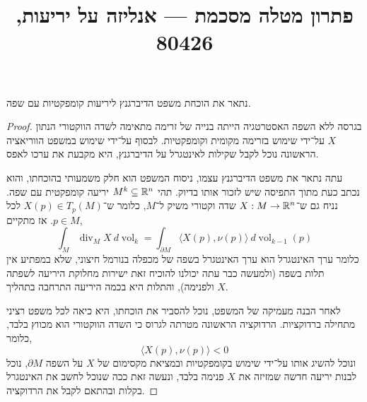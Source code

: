 
\title{פתרון מטלה מסכמת --- אנליזה על יריעות, 80426}

\DeclareMathOperator{\vol}{vol}
\DeclareMathOperator{\Div}{div}
\DeclareMathOperator{\curl}{curl}


\maketitle
\maketitleprint[blue]

\question{}
נתאר את הוכחת משפט הדיברגנץ ליריעות קומפקטיות עם שפה.
\begin{proof}
	בגרסה ללא השפה האסטרטגיה הייתה בנייה של זרימה מתאימה לשדה הווקטורי הנתון $X$ על־ידי שימוש בזרימה מקומית וקומפקטיות.
	לבסוף על־ידי שימוש במשפט הווריאציה הראשונה נוכל לקבל שקילות לאינטגרל על הדיברגנץ, היא מקבעת את ערכו לאפס.

	עתה נתאר את משפט הדיברגנץ עצמו, ניסוח המשפט הוא חלק משמעותי בהוכחתו, והוא נכתב כעת מתוך התפיסה שיש לזכור אותו בדיוק.
	תהי $M^k \subseteq \mathbb{R}^n$ יריעה קומפקטית עם שפה.
	נניח גם ש־$X : M \to \mathbb{R}^n$ שדה וקטורי משיק ל־$M$, כלומר ש־$X(p) \in T_p(M)$ לכל $p \in M$.
	אז מתקיים,
	\[
		\int_M \Div_M X\ d\vol_k
		= \int_{\partial M} \langle X(p), \nu(p) \rangle\ d\vol_{k - 1}(p)
	\]
	כלומר ערך האינטגרל הוא ערך האינטגרל בשפה של מכפלה בנורמל חיצוני, שלא במפתיע אין תלות בשפה (ולמעשה כבר עתה יכולנו להוכיח זאת ישירות מחלוקת היריעה לשפתה ולפנימה), והתלות היא בכמה היריעה התרחבה בתהליך $X$.

	לאחר הבנה מעמיקה של המשפט, נוכל להסביר את הוכחתו, היא כיאה לכל משפט רציני מתחילה ברדוקציות.
	הרדוקציה הראשונה מטרתה לגרוס כי השדה הווקטורי הוא מכווץ בלבד, כלומר,
	\[
		\langle X(p), \nu(p) \rangle < 0
	\]
	ונוכל להשיג אותו על־ידי שימוש בקומפקטיות ובמציאת מקסימום של $X$ על השפה $\partial M$, נוכל לבנות יריעה חדשה שמזיזה את $X$ פנימה בלבד, ונעשה זאת ככה שנוכל לחשב את האינטגרל בקלות ובהתאם לקבל את הרדוקציה.


\end{proof}
